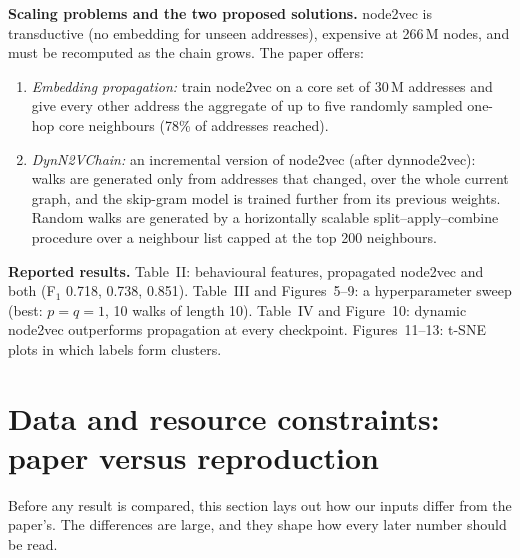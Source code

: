 \documentclass[11pt,a4paper]{article}
\begin{document}
\textbf{Scaling problems and the two proposed solutions.} node2vec is transductive (no embedding for unseen addresses), expensive at 266\,M nodes, and must be recomputed as the chain grows. The paper offers:
\begin{enumerate}
\item \emph{Embedding propagation:} train node2vec on a core set of 30\,M addresses and give every other address the aggregate of up to five randomly sampled one-hop core neighbours (78\% of addresses reached).
\item \emph{DynN2VChain:} an incremental version of node2vec (after dynnode2vec): walks are generated only from addresses that changed, over the whole current graph, and the skip-gram model is trained further from its previous weights. Random walks are generated by a horizontally scalable split--apply--combine procedure over a neighbour list capped at the top 200 neighbours.
\end{enumerate}

\textbf{Reported results.} Table~II: behavioural features, propagated node2vec and both (F$_1$ 0.718, 0.738, 0.851). Table~III and Figures~5--9: a hyperparameter sweep (best: $p=q=1$, 10 walks of length 10). Table~IV and Figure~10: dynamic node2vec outperforms propagation at every checkpoint. Figures~11--13: t-SNE plots in which labels form clusters.

\section{Data and resource constraints: paper versus reproduction}
\label{sec:constraints}
Before any result is compared, this section lays out how our inputs differ from the paper's. The differences are large, and they shape how every later number should be read.
\end{document}
